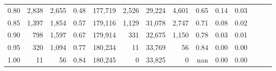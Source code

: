 \begin{tabular}{rrrrrrrrrrrrrr}
0.80 &   2,838 &  2,655 &  0.48 &  177,719 &    2,526 &  29,224 &   4,601 &  0.65 &  0.14 &      0.03 \\
0.85 &   1,397 &  1,854 &  0.57 &  179,116 &    1,129 &  31,078 &   2,747 &  0.71 &  0.08 &      0.02 \\
0.90 &     798 &  1,597 &  0.67 &  179,914 &      331 &  32,675 &   1,150 &  0.78 &  0.03 &      0.01 \\
0.95 &     320 &  1,094 &  0.77 &  180,234 &       11 &  33,769 &      56 &  0.84 &  0.00 &      0.00 \\
1.00 &      11 &     56 &  0.84 &  180,245 &        0 &  33,825 &       0 &   nan &  0.00 &      0.00 \\
\bottomrule
\end{tabular}
